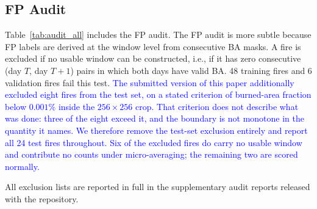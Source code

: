 \documentclass[sensors,article,submit,moreauthors,pdftex]{Definitions/mdpi}
\newcommand{\rev}[1]{\textcolor{blue}{#1}}
\begin{document}
\subsection{FP Audit}

Table~\ref{tab:audit_all} includes the FP audit. The FP audit is more subtle because FP labels are derived at the window level from consecutive BA masks. A fire is excluded if no usable window can be constructed, i.e., if it has zero consecutive (day $T$, day $T+1$) pairs in which both days have valid BA. 48 training fires and 6 validation fires fail this test. \rev{The submitted
version of this paper additionally excluded eight fires from the test set, on a
stated criterion of burned-area fraction below $0.001\%$ inside the
$256 \times 256$ crop. That criterion does not describe what was done: three of
the eight exceed it, and the boundary is not monotone in the quantity it names.
We therefore remove the test-set exclusion entirely and report all 24 test fires
throughout. Six of the excluded fires do carry no usable window and contribute
no counts under micro-averaging; the remaining two are scored normally.}

All exclusion lists are reported in full in the supplementary audit reports released with the repository.
\end{document}
